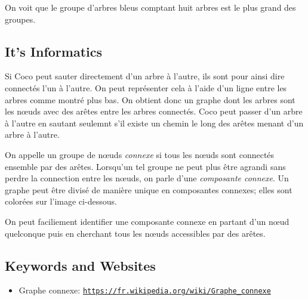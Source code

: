 \documentclass[a4paper,11pt]{report}
\newcommand{\BrochureUrlText}[1]{\texttt{#1}}
\newcommand{\taskGraphicsFolder}{..}
\begin{document}
{\centering%
\par}

On voit que le groupe d’arbres bleus comptant huit arbres est le plus grand des groupes.


\subsection*{It’s Informatics}

Si Coco peut sauter directement d’un arbre à l’autre, ils sont pour ainsi dire connectés l’un à l’autre. On peut représenter cela à l’aide d’un ligne entre les arbres comme montré plus bas. On obtient donc un graphe dont les arbres sont les nœuds avec des arêtes entre les arbres connectés. Coco peut passer d’un arbre à l’autre en sautant seulemnt s’il existe un chemin le long des arêtes menant d’un arbre à l’autre.

On appelle un groupe de nœuds \emph{connexe} si tous les nœuds sont connectés ensemble par des arêtes. Lorsqu’un tel groupe ne peut plus être agrandi sans perdre la connection entre les nœuds, on parle d’une \emph{composante connexe}. Un graphe peut être divisé de manière unique en composantes connexes; elles sont colorées sur l’image ci-dessous.

{\centering%
\par}

On peut faciliement identifier une composante connexe en partant d’un nœud quelconque puis en cherchant tous les nœuds accessibles par des arêtes.

{\raggedright

\subsection*{Keywords and Websites}

\begin{itemize}
  \item Graphe connexe: \href{https://fr.wikipedia.org/wiki/Graphe_connexe}{\BrochureUrlText{https://fr.wikipedia.org/wiki/Graphe\_connexe}}
\end{itemize}


}
\end{document}
